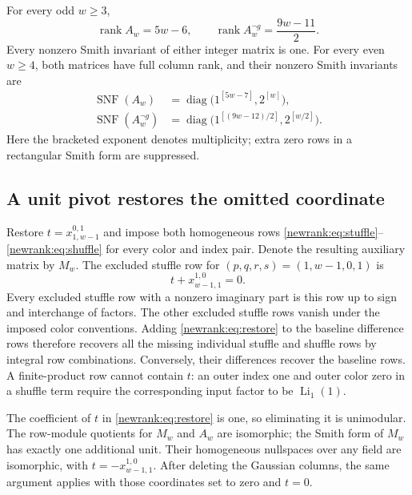 \begin{theorem}
\label{newrank:thm:smith}
For every odd $w\ge3$,
\begin{equation}\label{newrank:eq:odd}
 \operatorname{rank}A_w=5w-6,\qquad
 \operatorname{rank}A_w^{\neg g}=\frac{9w-11}{2}.
\end{equation}
Every nonzero Smith invariant of either integer matrix is one.
For every even $w\ge4$, both matrices have full column rank, and their
nonzero Smith invariants are
\begin{align}
 \operatorname{SNF}(A_w)
 &=\operatorname{diag}\bigl(1^{[5w-7]},2^{[w]}\bigr),
 \label{newrank:eq:evenfull}\\
 \operatorname{SNF}(A_w^{\neg g})
 &=\operatorname{diag}\bigl(1^{[(9w-12)/2]},2^{[w/2]}\bigr).
 \label{newrank:eq:evennong}
\end{align}
Here the bracketed exponent denotes multiplicity; extra zero rows in a
rectangular Smith form are suppressed.
\end{theorem}

\subsection{A unit pivot restores the omitted coordinate}

Restore $t=x_{1,w-1}^{0,1}$ and impose both homogeneous rows
\eqref{newrank:eq:stuffle}--\eqref{newrank:eq:shuffle} for every color and
index pair.  Denote the resulting auxiliary matrix by $M_w$.
The excluded stuffle row for $(p,q,r,s)=(1,w-1,0,1)$ is
\begin{equation}\label{newrank:eq:restore}
 t+x_{w-1,1}^{1,0}=0.
\end{equation}
Every excluded stuffle row with a nonzero imaginary part is this row up
to sign and interchange of factors.  The other excluded stuffle rows
vanish under the imposed color conventions.  Adding
\eqref{newrank:eq:restore} to the baseline difference rows therefore
recovers all the missing individual stuffle and shuffle rows by integral
row combinations.  Conversely, their differences recover the baseline
rows.  A finite-product row cannot contain $t$: an outer index one and
outer color zero in a shuffle term require the corresponding input
factor to be $\operatorname{Li}_1(1)$.

The coefficient of $t$ in \eqref{newrank:eq:restore} is one, so eliminating
it is unimodular.  The row-module quotients for $M_w$ and $A_w$ are
isomorphic; the Smith form of $M_w$ has exactly one additional unit.
Their homogeneous nullspaces over any field are isomorphic, with
$t=-x_{w-1,1}^{1,0}$.  After deleting the Gaussian columns, the same
argument applies with those coordinates set to zero and $t=0$.

